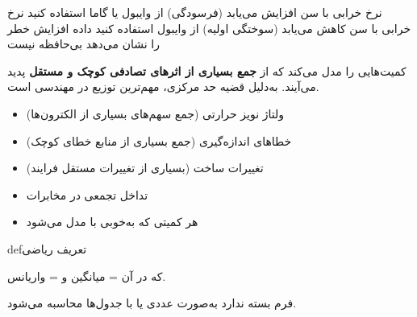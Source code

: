
\lr{\mbox{\PSno{}}} نرخ خرابی با سن افزایش می‌یابد (فرسودگی)  از وایبول یا گاما استفاده کنید\PSbr{}\lr{\mbox{\PSno{}}} نرخ خرابی با سن کاهش می‌یابد (سوختگی اولیه)  از وایبول استفاده کنید\PSbr{}\lr{\mbox{\PSno{}}} داده افزایش خطر را نشان می‌دهد  بی‌حافظه نیست



کمیت‌هایی را مدل می‌کند که از \textbf{جمع بسیاری از اثرهای تصادفی کوچک و مستقل} پدید می‌آیند. به‌دلیل قضیه حد مرکزی، مهم‌ترین توزیع در مهندسی است.


\begin{itemize}
\tightlist
\item
  ولتاژ نویز حرارتی (جمع سهم‌های بسیاری از الکترون‌ها)
\item
  خطاهای اندازه‌گیری (جمع بسیاری از منابع خطای کوچک)
\item
  تغییرات ساخت (بسیاری از تغییرات مستقل فرایند)
\item
  تداخل تجمعی در مخابرات
\item
  هر کمیتی که به‌خوبی با  مدل می‌شود
\end{itemize}

\begin{PSbox}[unbreakable]{def}{تعریف ریاضی}

 که در آن \lr{$\mu$} = میانگین و  = واریانس.

\end{PSbox}





فرم بسته ندارد  به‌صورت عددی یا با جدول‌ها محاسبه می‌شود.





